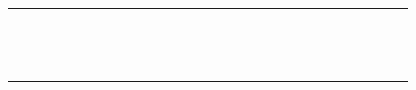 \begin{tabular}{rhchchchchchchchchchchchc}
\cite{GKS+:PPL14}&&&&&&&&&&&&&&&&&&&&&&&&\\
\addlinespace[2pt]
\cite{SIMA:ASE13}&&&&&&&&&&&&&&&&&&&&&&&&\\
\cite{SRK+:IST13}&&&&&&&&&&&&&&&&&&&&&&&&\\
\cite{useGYS+:EMSE18}&&&&&&&&&&&&&&&&&&&&&&&&\\
\cite{SRA:GPCE13}&&&&&&&&&&&&&&&&&&&&&&&&\\
\cite{KMKB:ESECFSE13}&&&&&&&&&&&&&&&&&&&&&&&&\\
\addlinespace[2pt]
\cite{SKK+:ICSE12}&&&&&&&&&&&&&&&&&&&&&&&&\\
\cite{SRK+:SQJ12}&&&&&&&&&&&&&&&&&&&&&&&&\\
\cite{BMP:SERENE12}&&&&&&&&&&&&&&&&&&&&&&&&\\
\cite{useKBK:AOSD11}&&&&&&&&&&&&&&&&&&&&&&&&\\
\cite{SRKKS:APSEC08}&&&&&&&&&&&&&&&&&&&&&&&&\\
\addlinespace[2pt]
\cite{CDS:ROSATEA06}&&&&&&&&&&&&&&&&&&&&&&&&\\
\bottomrule
\end{tabular}
